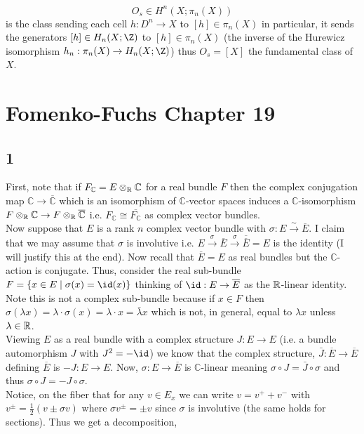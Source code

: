 \documentclass[12pt]{extarticle}
\newcommand{\C}{\mathbb{C}}
\begin{document}
\[ O_s \in H^n(X; \pi_n(X)) \]
is the class sending each cell $h : D^n \to X$ to $[h] \in \pi_n(X)$ in particular, it sends the generators $[h] \in H_n(X; \Z)$ to $[h] \in \pi_n(X)$ (the inverse of the Hurewicz isomorphism $h_n : \pi_n(X) \to H_n(X; \Z)$) thus $O_s = [X]$ the fundamental class of $X$.

\section{Fomenko-Fuchs Chapter 19}

\subsection{1}

First, note that if $F_\C = E \otimes_\R \C$ for a real bundle $F$ then the complex conjugation map $\C \to \overline{\C}$ which is an isomorphism of $\C$-vector spaces induces a $\C$-isomorphism $F \otimes_\R \C \to F \otimes_\R \overline{\C}$ i.e. $F_{\C} \cong \overline{F_{\C}}$ as complex vector bundles.
\bigskip\\
Now suppose that $E$ is a rank $n$ complex vector bundle with $\sigma : E \xrightarrow{\sim} \overline{E}$. I claim that we may assume that $\sigma$ is involutive i.e. $E \xrightarrow{\sigma} \overline{E} \xrightarrow{\sigma} \overline{\overline{E}} = E$ is the identity (I will justify this at the end). Now recall that $\overline{E} = E$ as real bundles but the $\C$-action is conjugate. Thus, consider the real sub-bundle $F = \{ x \in E \mid \sigma(x) = \id(x) \}$ thinking of $\id : E \to \overline{E}$ as the $\mathbb{R}$-linear identity. Note this is not a complex sub-bundle because if $x \in F$ then $\sigma(\lambda x) = \lambda \cdot \sigma(x) = \lambda \cdot x = \bar{\lambda} x$ which is not, in general, equal to $\lambda x$ unless $\lambda \in \mathbb{R}$.
\bigskip\\
Viewing $E$ as a real bundle with a complex structure $J : E \to E$ (i.e. a bundle automorphism $J$ with $J^2 = - \id$) we know that the complex structure, $\bar{J} : \overline{E} \to \overline{E}$ defining $\overline{E}$ is $-J : E \to E$. Now, $\sigma : E \to \overline{E}$ is $\C$-linear meaning $\sigma \circ J = \bar{J} \circ \sigma$ and thus $\sigma \circ J = - J \circ \sigma$.
\bigskip\\
Notice, on the fiber that for any $v \in E_x$ we can write $v = v^{+} + v^{-}$ with $v^{\pm} = \tfrac{1}{2}(v \pm \sigma v)$ where $\sigma v^{\pm} = \pm v$ since $\sigma$ is involutive (the same holds for sections). Thus we get a decomposition,
\end{document}
